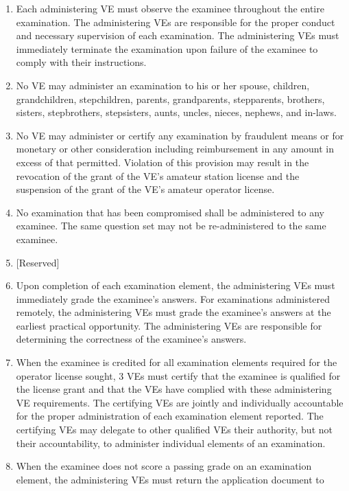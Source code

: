 \documentclass[
  letterpaper,
  DIV=11,
  numbers=noendperiod]{scrreport}
\begin{document}
\begin{enumerate}
\def\labelenumi{(\alph{enumi})}
\setcounter{enumi}{2}
\item
  Each administering VE must observe the examinee throughout the entire
  examination. The administering VEs are responsible for the proper
  conduct and necessary supervision of each examination. The
  administering VEs must immediately terminate the examination upon
  failure of the examinee to comply with their instructions.
\item
  No VE may administer an examination to his or her spouse, children,
  grandchildren, stepchildren, parents, grandparents, stepparents,
  brothers, sisters, stepbrothers, stepsisters, aunts, uncles, nieces,
  nephews, and in-laws.
\item
  No VE may administer or certify any examination by fraudulent means or
  for monetary or other consideration including reimbursement in any
  amount in excess of that permitted. Violation of this provision may
  result in the revocation of the grant of the VE's amateur station
  license and the suspension of the grant of the VE's amateur operator
  license.
\item
  No examination that has been compromised shall be administered to any
  examinee. The same question set may not be re-administered to the same
  examinee.
\item
  {[}Reserved{]}
\item
  Upon completion of each examination element, the administering VEs
  must immediately grade the examinee's answers. For examinations
  administered remotely, the administering VEs must grade the examinee's
  answers at the earliest practical opportunity. The administering VEs
  are responsible for determining the correctness of the examinee's
  answers.
\item
  When the examinee is credited for all examination elements required
  for the operator license sought, 3 VEs must certify that the examinee
  is qualified for the license grant and that the VEs have complied with
  these administering VE requirements. The certifying VEs are jointly
  and individually accountable for the proper administration of each
  examination element reported. The certifying VEs may delegate to other
  qualified VEs their authority, but not their accountability, to
  administer individual elements of an examination.
\item
  When the examinee does not score a passing grade on an examination
  element, the administering VEs must return the application document to

\end{enumerate}
\end{document}
